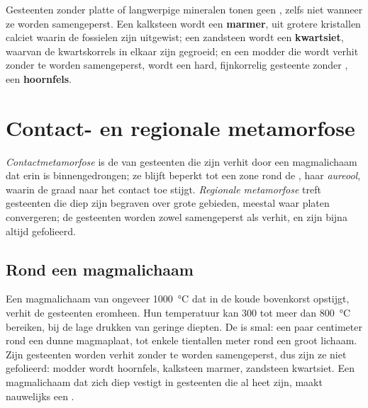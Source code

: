 Gesteenten zonder platte of langwerpige mineralen tonen geen , zelfs niet wanneer ze
worden samengeperst. Een kalksteen wordt een \textbf{marmer}, uit grotere kristallen
calciet waarin de fossielen zijn uitgewist; een zandsteen wordt een
\textbf{kwartsiet}, waarvan de kwartskorrels in elkaar zijn gegroeid; en een
modder die wordt verhit zonder te worden samengeperst, wordt een hard, fijnkorrelig gesteente zonder
, een \textbf{hoornfels}.

\section{Contact- en regionale metamorfose}

\begin{definition}\label{def:g12:metamorphic-rocks:contact-regional}
\emph{Contactmetamorfose} is de 
van gesteenten die zijn verhit door een magmalichaam dat erin is binnengedrongen; ze blijft beperkt tot
een zone rond de , haar \emph{aureool}, waarin de
graad naar het contact toe stijgt. \emph{Regionale
metamorfose} treft gesteenten die diep zijn begraven over
grote gebieden, meestal waar platen convergeren; de gesteenten worden zowel samengeperst als
verhit, en zijn bijna altijd gefolieerd.
\end{definition}

\subsection{Rond een magmalichaam}

Een magmalichaam van ongeveer \qty{1000}{\celsius} dat in de koude bovenkorst
opstijgt, verhit de gesteenten eromheen. Hun temperatuur kan 300 tot meer
dan \qty{800}{\celsius} bereiken, bij de lage drukken van geringe diepten. De
 is smal: een paar centimeter rond een dunne magmaplaat, tot
enkele tientallen meter rond een groot lichaam. Zijn gesteenten worden verhit zonder
te worden samengeperst, dus zijn ze niet gefolieerd: modder wordt hoornfels, kalksteen
marmer, zandsteen kwartsiet. Een magmalichaam dat zich diep vestigt in gesteenten die
al heet zijn, maakt nauwelijks een .

